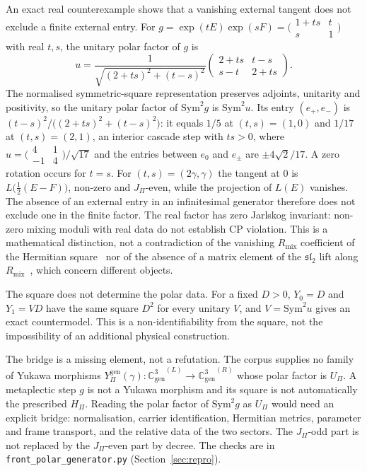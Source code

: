 \documentclass[11pt]{article}
\theoremstyle{definition}
\theoremstyle{remark}
\newcommand{\JPi}{J_{\Pi}}
\newcommand{\Cgen}{\mathbb{C}^{3}_{\mathrm{gen}}}
\newcommand{\GL}{{\Cgen}^{(L)}}
\newcommand{\GR}{{\Cgen}^{(R)}}
\newcommand{\Ygen}{{Y^{\mathrm{gen}}_{\Pi}}}
\newcommand{\Hpi}{H_{\Pi}}
\newcommand{\Upi}{U_{\Pi}}
\newcommand{\Sym}{\mathrm{Sym}}
\begin{document}
      An exact real counterexample shows that a vanishing external tangent does not exclude a finite external entry.
      For $g = \exp(tE)\exp(sF) = \bigl(\begin{smallmatrix} 1 + ts & t \\ s & 1 \end{smallmatrix}\bigr)$
      with real $t, s$, the unitary polar factor of $g$ is
      \[
        u = \frac{1}{\sqrt{(2 + ts)^{2} + (t - s)^{2}}}
        \begin{pmatrix} 2 + ts & t - s \\ s - t & 2 + ts \end{pmatrix}.
      \]
      The normalised symmetric-square representation preserves adjoints, unitarity and positivity, so the unitary polar
      factor of $\Sym^{2}g$ is $\Sym^{2}u$.
      Its entry $(e_{+}, e_{-})$ is $(t - s)^{2}/\big((2 + ts)^{2} + (t - s)^{2}\big)$: it equals $1/5$ at
      $(t, s) = (1, 0)$ and $1/17$ at $(t, s) = (2, 1)$, an interior cascade step with $ts > 0$, where
      $u = \bigl(\begin{smallmatrix} 4 & 1 \\ -1 & 4 \end{smallmatrix}\bigr)/\sqrt{17}$ and the entries between
      $e_{0}$ and $e_{\pm}$ are $\pm 4\sqrt{2}/17$.
      A zero rotation occurs for $t = s$.
      For $(t, s) = (2\gamma, \gamma)$ the tangent at $0$ is $L\big(\tfrac12(E - F)\big)$, non-zero and $\JPi$-even,
      while the projection of $L(E)$ vanishes.
      The absence of an external entry in an infinitesimal generator therefore does not exclude one in the finite
      factor.
      The real factor has zero Jarlskog invariant: non-zero mixing moduli with real data do not establish CP violation.
      This is a mathematical distinction, not a contradiction of the vanishing $R_{\mathrm{mix}}$ coefficient of the
      Hermitian square~\cite{Beau2026prs} nor of the absence of a matrix element of the $\mathfrak{sl}_{2}$ lift
      along $R_{\mathrm{mix}}$~\cite{Beau2026q14}, which concern different objects.

      The square does not determine the polar data.
      For a fixed $D > 0$, $Y_{0} = D$ and $Y_{1} = VD$ have the same square $D^{2}$ for every unitary $V$, and
      $V = \Sym^{2}u$ gives an exact countermodel.
      This is a non-identifiability from the square, not the impossibility of an additional physical construction.

      The bridge is a missing element, not a refutation.
      The corpus supplies no family of Yukawa morphisms $\Ygen(\gamma) : \GL \to \GR$ whose polar factor is $\Upi$.
      A metaplectic step $g$ is not a Yukawa morphism and its square is not automatically the prescribed $\Hpi$.
      Reading the polar factor of $\Sym^{2}g$ as $\Upi$ would need an explicit bridge: normalisation, carrier
      identification, Hermitian metrics, parameter and frame transport, and the relative data of the two sectors.
      The $\JPi$-odd part is not replaced by the $\JPi$-even part by decree.
      The checks are in \texttt{front\_polar\_generator.py} (Section~\ref{sec:repro}).
\end{document}
